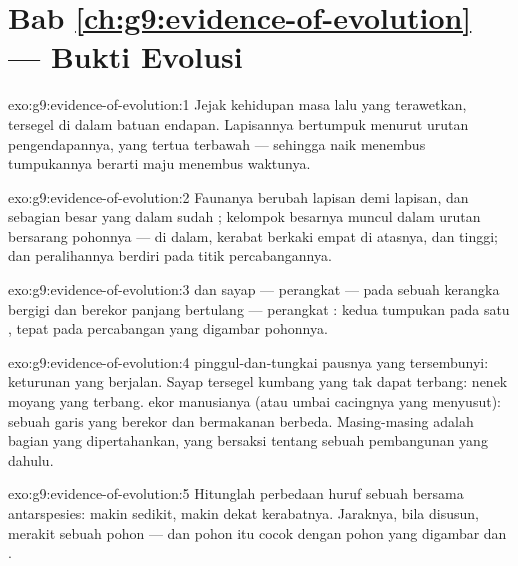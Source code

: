 \section*{Bab \ref{ch:g9:evidence-of-evolution} --- Bukti Evolusi}

\begin{solution}{exo:g9:evidence-of-evolution:1}
Jejak kehidupan masa lalu yang terawetkan, tersegel di dalam
batuan endapan. Lapisannya bertumpuk menurut urutan
pengendapannya, yang tertua terbawah --- sehingga naik
menembus tumpukannya berarti maju menembus waktunya.
\end{solution}

\begin{solution}{exo:g9:evidence-of-evolution:2}
Faunanya berubah lapisan demi lapisan, dan sebagian besar
 yang dalam sudah ; kelompok besarnya muncul
dalam urutan bersarang pohonnya ---  di dalam, kerabat
berkaki empat di atasnya,  dan  tinggi; dan
peralihannya berdiri pada titik percabangannya.
\end{solution}

\begin{solution}{exo:g9:evidence-of-evolution:3}
 dan sayap --- perangkat  --- pada sebuah
kerangka bergigi dan berekor panjang bertulang --- perangkat
: kedua tumpukan pada satu , tepat pada
percabangan yang digambar pohonnya.
\end{solution}

\begin{solution}{exo:g9:evidence-of-evolution:4}
 pinggul-dan-tungkai pausnya yang tersembunyi:
keturunan yang berjalan. Sayap tersegel kumbang yang tak
dapat terbang: nenek moyang yang terbang.  ekor
manusianya (atau umbai cacingnya yang menyusut): sebuah garis
yang berekor dan bermakanan berbeda. Masing-masing adalah
bagian yang dipertahankan, yang bersaksi tentang sebuah
pembangunan yang dahulu.
\end{solution}

\begin{solution}{exo:g9:evidence-of-evolution:5}
Hitunglah perbedaan huruf sebuah  bersama antarspesies:
makin sedikit, makin dekat kerabatnya. Jaraknya, bila
disusun, merakit sebuah pohon --- dan pohon itu cocok dengan
pohon yang digambar  dan .
\end{solution}


